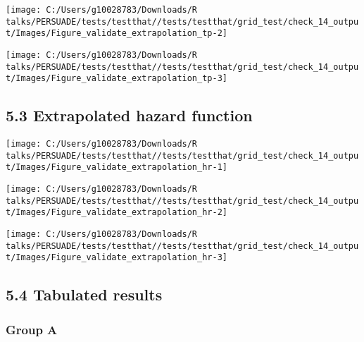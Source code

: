 \documentclass[
]{article}
\begin{document}
\begin{flushleft}\texttt{[image: C:/Users/g10028783/Downloads/R talks/PERSUADE/tests/testthat//tests/testthat/grid\_test/check\_14\_output/Images/Figure\_validate\_extrapolation\_tp-2]} \end{flushleft}

\begin{flushleft}\texttt{[image: C:/Users/g10028783/Downloads/R talks/PERSUADE/tests/testthat//tests/testthat/grid\_test/check\_14\_output/Images/Figure\_validate\_extrapolation\_tp-3]} \end{flushleft}

\clearpage

\subsection{5.3 Extrapolated hazard
function}\label{extrapolated-hazard-function}

\begin{flushleft}\texttt{[image: C:/Users/g10028783/Downloads/R talks/PERSUADE/tests/testthat//tests/testthat/grid\_test/check\_14\_output/Images/Figure\_validate\_extrapolation\_hr-1]} \end{flushleft}

\begin{flushleft}\texttt{[image: C:/Users/g10028783/Downloads/R talks/PERSUADE/tests/testthat//tests/testthat/grid\_test/check\_14\_output/Images/Figure\_validate\_extrapolation\_hr-2]} \end{flushleft}

\begin{flushleft}\texttt{[image: C:/Users/g10028783/Downloads/R talks/PERSUADE/tests/testthat//tests/testthat/grid\_test/check\_14\_output/Images/Figure\_validate\_extrapolation\_hr-3]} \end{flushleft}

\clearpage

\subsection{5.4 Tabulated results}\label{tabulated-results}

\subsubsection{Group A}\label{group-a}
\end{document}
